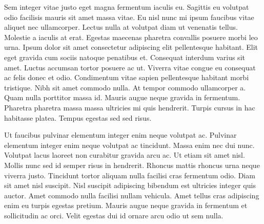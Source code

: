 \documentclass[
]{article}
\begin{document}
Sem integer vitae justo eget magna fermentum iaculis eu. Sagittis eu volutpat odio facilisis mauris sit amet massa vitae. Eu nisl nunc mi ipsum faucibus vitae aliquet nec ullamcorper. Lectus nulla at volutpat diam ut venenatis tellus. Molestie a iaculis at erat. Egestas maecenas pharetra convallis posuere morbi leo urna. Ipsum dolor sit amet consectetur adipiscing elit pellentesque habitant. Elit eget gravida cum sociis natoque penatibus et. Consequat interdum varius sit amet. Luctus accumsan tortor posuere ac ut. Viverra vitae congue eu consequat ac felis donec et odio. Condimentum vitae sapien pellentesque habitant morbi tristique. Nibh sit amet commodo nulla. At tempor commodo ullamcorper a. Quam nulla porttitor massa id. Mauris augue neque gravida in fermentum. Pharetra pharetra massa massa ultricies mi quis hendrerit. Turpis cursus in hac habitasse platea. Tempus egestas sed sed risus.

Ut faucibus pulvinar elementum integer enim neque volutpat ac. Pulvinar elementum integer enim neque volutpat ac tincidunt. Massa enim nec dui nunc. Volutpat lacus laoreet non curabitur gravida arcu ac. Ut etiam sit amet nisl. Mollis nunc sed id semper risus in hendrerit. Rhoncus mattis rhoncus urna neque viverra justo. Tincidunt tortor aliquam nulla facilisi cras fermentum odio. Diam sit amet nisl suscipit. Nisl suscipit adipiscing bibendum est ultricies integer quis auctor. Amet commodo nulla facilisi nullam vehicula. Amet tellus cras adipiscing enim eu turpis egestas pretium. Mauris augue neque gravida in fermentum et sollicitudin ac orci. Velit egestas dui id ornare arcu odio ut sem nulla.
\end{document}

